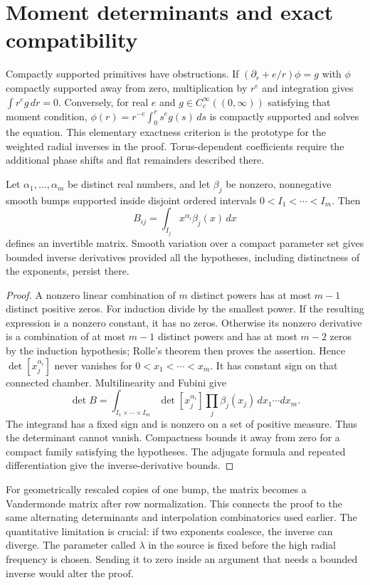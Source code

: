 \section{Moment determinants and exact compatibility}

Compactly supported primitives have obstructions. If $(\partial_r+e/r)\phi=g$ with $\phi$ compactly supported away from zero, multiplication by $r^e$ and integration gives $\int r^e g\,dr=0$. Conversely, for real $e$ and $g\in C_c^\infty((0,\infty))$ satisfying that moment condition,
$\phi(r)=r^{-e}\int_0^r s^e g(s)\,ds$ is compactly supported and solves the equation. This elementary exactness criterion is the prototype for the weighted radial inverses in the proof. Torus-dependent coefficients require the additional phase shifts and flat remainders described there.

\begin{proposition}
\label{prop:fluid-moments}
Let $\alpha_1,\ldots,\alpha_m$ be distinct real numbers, and let $\beta_j$ be nonzero, nonnegative smooth bumps supported inside disjoint ordered intervals $0<I_1<\cdots<I_m$. Then
\[
 B_{ij}=\int_{I_j}x^{\alpha_i}\beta_j(x)\,dx
\]
defines an invertible matrix. Smooth variation over a compact parameter set gives bounded inverse derivatives provided all the hypotheses, including distinctness of the exponents, persist there.
\end{proposition}
\begin{proof}
A nonzero linear combination of $m$ distinct powers has at most $m-1$ distinct positive zeros. For induction divide by the smallest power. If the resulting expression is a nonzero constant, it has no zeros. Otherwise its nonzero derivative is a combination of at most $m-1$ distinct powers and has at most $m-2$ zeros by the induction hypothesis; Rolle's theorem then proves the assertion. Hence $\det[x_j^{\alpha_i}]$ never vanishes for $0<x_1<\cdots<x_m$. It has constant sign on that connected chamber. Multilinearity and Fubini give
\[
 \det B=\int_{I_1\times\cdots\times I_m}
 \det[x_j^{\alpha_i}]\prod_j\beta_j(x_j)\,dx_1\cdots dx_m.
\]
The integrand has a fixed sign and is nonzero on a set of positive measure. Thus the determinant cannot vanish. Compactness bounds it away from zero for a compact family satisfying the hypotheses. The adjugate formula and repeated differentiation give the inverse-derivative bounds.
\end{proof}

For geometrically rescaled copies of one bump, the matrix becomes a Vandermonde matrix after row normalization. This connects the proof to the same alternating determinants and interpolation combinatorics used earlier. The quantitative limitation is crucial: if two exponents coalesce, the inverse can diverge. The parameter called $\lambda$ in the source is fixed before the high radial frequency is chosen. Sending it to zero inside an argument that needs a bounded inverse would alter the proof.

